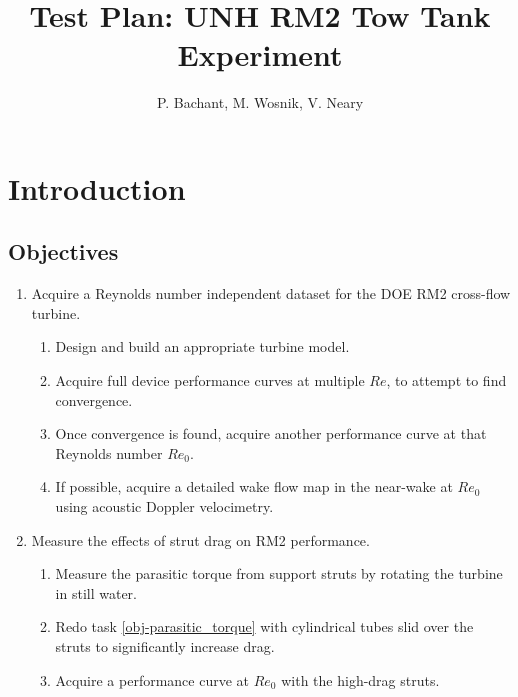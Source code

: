 \documentclass{article}
\author{P. Bachant, M. Wosnik, V. Neary}
\title{Test Plan: UNH RM2 Tow Tank Experiment}
\begin{document}
\maketitle

\section{Introduction}


\subsection{Objectives}

\begin{enumerate}

	\item Acquire a Reynolds number independent dataset for the DOE RM2 cross-flow
	turbine.

		\begin{enumerate}
			\item Design and build an appropriate turbine model.
		
			\item Acquire full device performance curves at multiple $Re$, to attempt to
			find convergence.
		  
			\item Once convergence is found, acquire another performance curve at that
			Reynolds number $Re_0$.
		
			\item If possible, acquire a detailed wake flow map in the near-wake at
			$Re_0$ using acoustic Doppler velocimetry.
		\end{enumerate}
	
	\item Measure the effects of strut drag on RM2 performance.
	
	\begin{enumerate}
		\item Measure the parasitic torque from support struts by rotating the turbine
		in still water. \label{obj-parasitic_torque}
		
		\item Redo task \ref{obj-parasitic_torque} with cylindrical tubes slid over
		the struts to significantly increase drag.
		
		\item Acquire a performance curve at $Re_0$ with the high-drag struts. 
	\end{enumerate}
	
\end{enumerate}
\end{document}
